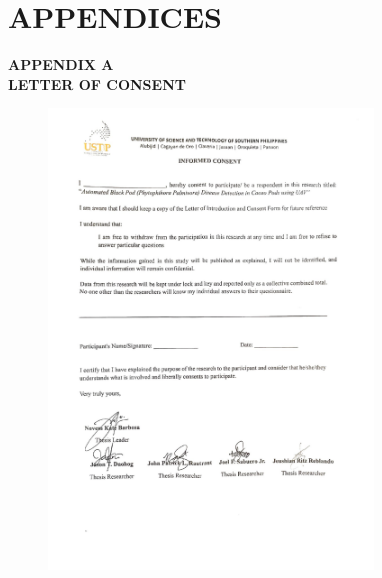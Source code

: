 \chapter*{APPENDICES}

\begin{center}
	\bfseries APPENDIX A \\[4pt]
	\normalfont LETTER OF CONSENT
\end{center}

\vspace{1cm}

\begin{figure}[H]
	\centering
	\includegraphics[width=0.77\textwidth]{appendix_pdf/appendix_a1.pdf}
\end{figure}

\clearpage %

